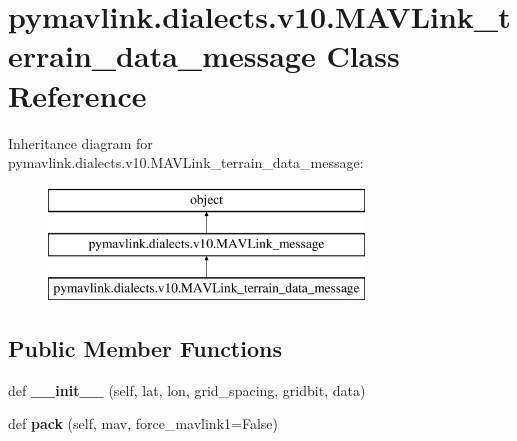 \hypertarget{classpymavlink_1_1dialects_1_1v10_1_1MAVLink__terrain__data__message}{}\section{pymavlink.\+dialects.\+v10.\+M\+A\+V\+Link\+\_\+terrain\+\_\+data\+\_\+message Class Reference}
\label{classpymavlink_1_1dialects_1_1v10_1_1MAVLink__terrain__data__message}
Inheritance diagram for pymavlink.\+dialects.\+v10.\+M\+A\+V\+Link\+\_\+terrain\+\_\+data\+\_\+message\+:\begin{figure}[H]
\begin{center}
\leavevmode
\includegraphics[height=3.000000cm]{classpymavlink_1_1dialects_1_1v10_1_1MAVLink__terrain__data__message}
\end{center}
\end{figure}
\subsection*{Public Member Functions}
\begin{DoxyCompactItemize}
\item 
\mbox{\label{classpymavlink_1_1dialects_1_1v10_1_1MAVLink__terrain__data__message_afdd4c5fc4150763d97e56d04afa0b60b}} 
def {\bfseries \+\_\+\+\_\+init\+\_\+\+\_\+} (self, lat, lon, grid\+\_\+spacing, gridbit, data)
\item 
\mbox{\label{classpymavlink_1_1dialects_1_1v10_1_1MAVLink__terrain__data__message_abb9caeed99a26a18682a1bfcae8d4b77}} 
def {\bfseries pack} (self, mav, force\+\_\+mavlink1=False)
\end{DoxyCompactItemize}

